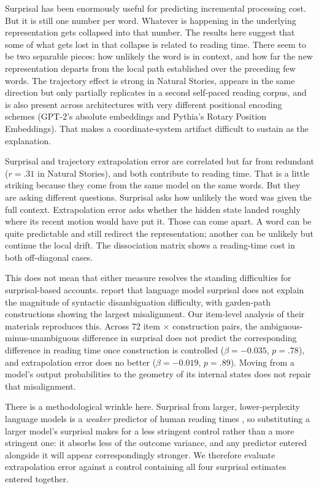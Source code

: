 \documentclass[12pt]{article}
\newcommand{\new}[1]{#1}   %
\begin{document}
Surprisal has been enormously useful for predicting incremental processing cost. But it is still one number per word. Whatever is happening in the underlying representation gets collapsed into that number. The results here suggest that some of what gets lost in that collapse is related to reading time. There seem to be two separable pieces: how unlikely the word is in context, and how far the new representation departs from the local path established over the preceding few words. The trajectory effect \new{is strong in Natural Stories, appears in the same direction but only partially replicates in a second self-paced reading corpus, and is also present across} architectures with very different positional encoding schemes (GPT-2's absolute embeddings and Pythia's Rotary Position Embeddings). That makes a coordinate-system artifact difficult to sustain as the explanation.

Surprisal and trajectory extrapolation error are \new{correlated but far from redundant ($r = .31$ in Natural Stories)}, and both contribute to reading time. That is a little striking because they come from the same model on the same words. But they are asking different questions. Surprisal asks how unlikely the word was given the full context. Extrapolation error asks whether the hidden state landed roughly where its recent motion would have put it. Those can come apart. A word can be quite predictable and still redirect the representation; another can be unlikely but continue the local drift. The \new{dissociation matrix shows a reading-time cost in both off-diagonal cases}.

\new{This does not mean that either measure resolves the standing difficulties for surprisal-based accounts. \citet{huang2024} report that language model surprisal does not explain the magnitude of syntactic disambiguation difficulty, with garden-path constructions showing the largest misalignment. Our item-level analysis of their materials reproduces this. Across 72 item $\times$ construction pairs, the ambiguous-minus-unambiguous difference in surprisal does not predict the corresponding difference in reading time once construction is controlled ($\beta = -0.035$, $p = .78$), and extrapolation error does no better ($\beta = -0.019$, $p = .89$). Moving from a model's output probabilities to the geometry of its internal states does not repair that misalignment.}

\new{There is a methodological wrinkle here. Surprisal from larger, lower-perplexity language models is a \textit{weaker} predictor of human reading times \citep{oh2023b}, so substituting a larger model's surprisal makes for a less stringent control rather than a more stringent one: it absorbs less of the outcome variance, and any predictor entered alongside it will appear correspondingly stronger. We therefore evaluate extrapolation error against a control containing all four surprisal estimates entered together.}
\end{document}
